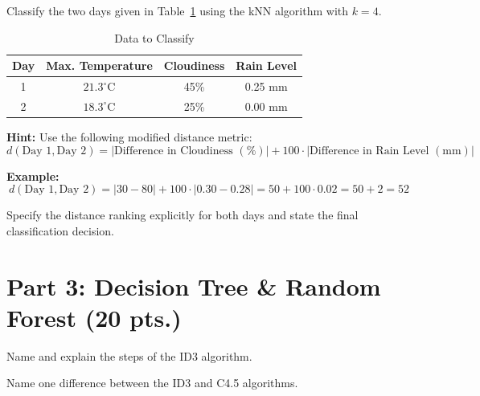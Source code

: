 \documentclass[12pt]{article}
\begin{document}
    \begin{ejercicio}
        Classify the two days given in Table~\ref{tab:data_to_classify} using the kNN algorithm with $k=4$.

        \begin{table}[h!]
        \centering
        \begin{tabular}{|c|c|c|c|}
        \hline
        \textbf{Day} & \textbf{Max. Temperature} & \textbf{Cloudiness} & \textbf{Rain Level} \\ \hline
        1 & $21.3^{\circ}\text{C}$ & 45\% & 0.25 mm \\ \hline
        2 & $18.3^{\circ}\text{C}$ & 25\% & 0.00 mm \\ \hline
        \end{tabular}
        \caption{Data to Classify}
        \label{tab:data_to_classify}
        \end{table}

        \textbf{Hint:} Use the following modified distance metric:
        \[ d(\text{Day } 1, \text{Day } 2) = |\text{Difference in Cloudiness } (\%)| + 100 \cdot |\text{Difference in Rain Level } (\text{mm})| \]

        \textbf{Example:}
        \[ d(\text{Day } 1, \text{Day } 2) = |30 - 80| + 100 \cdot |0.30 - 0.28| = 50 + 100 \cdot 0.02 = 50 + 2 = 52 \]

        Specify the distance ranking explicitly for both days and state the final classification decision.
    \end{ejercicio}

    \newpage


    \section*{Part 3: Decision Tree \& Random Forest (20 pts.)}

    \begin{ejercicio}
        Name and explain the steps of the ID3 algorithm.
    \end{ejercicio}

    \begin{ejercicio}[ID3 vs. C4.5 (2 pts.)]
        Name one difference between the ID3 and C4.5 algorithms.
    \end{ejercicio}
\end{document}
